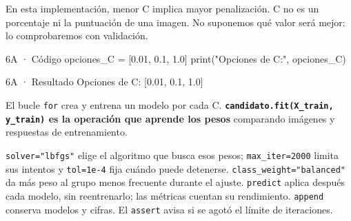 En esta implementación, menor C implica mayor penalización. C no es un porcentaje ni la puntuación de una imagen. No suponemos qué valor será mejor: lo comprobaremos con validación.


\begin{Codigo}{6A · Código}
opciones_C = [0.01, 0.1, 1.0]
print("Opciones de C:", opciones_C)
\end{Codigo}

\begin{Salida}{6A · Resultado}
Opciones de C: [0.01, 0.1, 1.0]
\end{Salida}

\label{paso-6b}

El bucle \texttt{\small for} crea y entrena un modelo por cada C. \textbf{\texttt{\small candidato.\allowbreak{}fit(\allowbreak{}X\_\allowbreak{}train,\allowbreak{} y\_\allowbreak{}train)\allowbreak{}} es la operación que aprende los pesos} comparando imágenes y respuestas de entrenamiento.

\texttt{\small solver=\allowbreak{}"lbfgs"} elige el algoritmo que busca esos pesos; \texttt{\small max\_\allowbreak{}iter=\allowbreak{}2000} limita sus intentos y \texttt{\small tol=\allowbreak{}1e-4} fija cuándo puede detenerse. \texttt{\small class\_\allowbreak{}weight=\allowbreak{}"balanced"} da más peso al grupo menos frecuente durante el ajuste. \texttt{\small predict} aplica después cada modelo, sin reentrenarlo; las métricas cuentan su rendimiento. \texttt{\small append} conserva modelos y cifras. El \texttt{\small assert} avisa si se agotó el límite de iteraciones.




